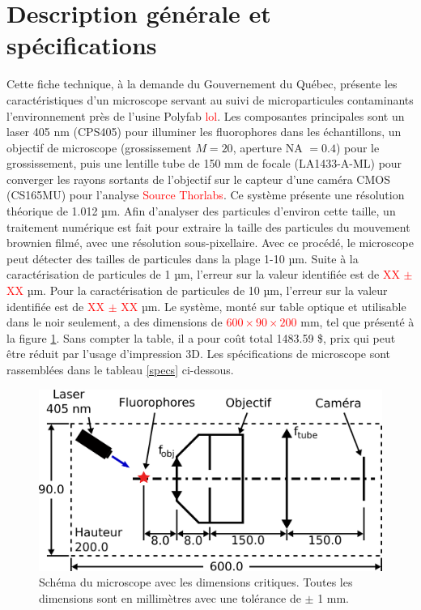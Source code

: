 \documentclass[11pt,letterpaper]{article}
\begin{document}

\section{Description générale et spécifications}

Cette fiche technique, à la demande du Gouvernement du Québec, présente les caractéristiques 
d'un microscope servant au suivi de microparticules contaminants l'environnement près de 
l'usine Polyfab \textcolor{red}{lol}. Les composantes principales sont un laser 405 nm (CPS405)
pour illuminer les fluorophores dans les échantillons, un objectif de microscope (grossissement 
$M = 20$, aperture NA $= 0.4$) pour le grossissement, puis une lentille tube de 150 mm de focale
(LA1433-A-ML) pour converger les rayons sortants de l'objectif sur le capteur d'une caméra CMOS 
(CS165MU) pour l'analyse \textcolor{red}{Source Thorlabs}. Ce système présente une résolution
théorique de 1.012 µm. Afin d'analyser des particules d'environ cette taille, un traitement
numérique est fait pour extraire la taille des particules du mouvement brownien filmé, avec 
une résolution sous-pixellaire. Avec ce procédé, le microscope peut détecter des tailles de 
particules dans la plage 1-10 µm. Suite à la caractérisation de particules 
de 1 µm, l'erreur sur la valeur identifiée est de \textcolor{red}{XX $\pm$ XX} µm.
Pour la caractérisation de particules de 10 µm, l'erreur sur la valeur identifiée est de 
\textcolor{red}{XX $\pm$ XX} µm. Le système, monté sur table optique et utilisable dans le noir 
seulement, a des dimensions de \textcolor{red}{$600 \times 90 \times 200$} mm, tel que présenté à 
la figure \ref{schema_micro}. Sans compter la table, il a pour coût total 1483.59 \$, prix qui
peut être réduit par l'usage d'impression 3D. Les spécifications de microscope sont rassemblées dans le
tableau \ref{specs} ci-dessous.


\begin{figure}[H]
  \centering
  \includegraphics[scale=2.8]{schema_fiche_tech.png}
  \caption{Schéma du microscope avec les dimensions critiques. Toutes les dimensions sont en millimètres avec une tolérance de $\pm$ 1 mm.}
  \label{schema_micro}
\end{figure}
\end{document}
